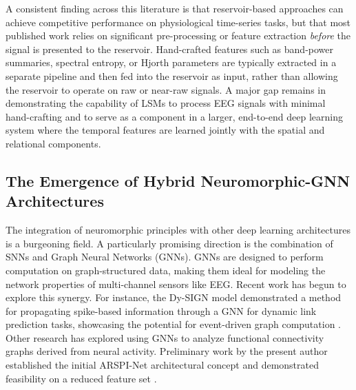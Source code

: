A consistent finding across this literature is that reservoir-based approaches can achieve competitive performance on physiological time-series tasks, but that most published work relies on significant pre-processing or feature extraction \emph{before} the signal is presented to the reservoir. Hand-crafted features such as band-power summaries, spectral entropy, or Hjorth parameters are typically extracted in a separate pipeline and then fed into the reservoir as input, rather than allowing the reservoir to operate on raw or near-raw signals. A major gap remains in demonstrating the capability of LSMs to process EEG signals with minimal hand-crafting and to serve as a component in a larger, end-to-end deep learning system where the temporal features are learned jointly with the spatial and relational components.

\subsection{The Emergence of Hybrid Neuromorphic-GNN Architectures}
The integration of neuromorphic principles with other deep learning architectures is a burgeoning field. A particularly promising direction is the combination of SNNs and Graph Neural Networks (GNNs). GNNs are designed to perform computation on graph-structured data, making them ideal for modeling the network properties of multi-channel sensors like EEG. Recent work has begun to explore this synergy. For instance, the Dy-SIGN model demonstrated a method for propagating spike-based information through a GNN for dynamic link prediction tasks, showcasing the potential for event-driven graph computation \cite{Yoon2024DySIGN}. Other research has explored using GNNs to analyze functional connectivity graphs derived from neural activity. Preliminary work by the present author established the initial ARSPI-Net architectural concept and demonstrated feasibility on a reduced feature set \cite{lane_arspi_2024}.

